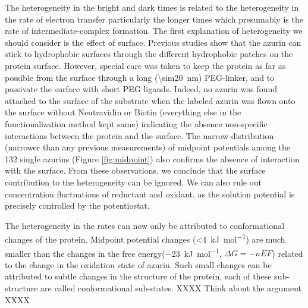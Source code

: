 The heterogeneity in the bright and dark times is related to the heterogeneity in the rate of electron transfer particularly the longer times which presumably is the rate of intermediate-complex formation.
The first explanation of heterogeneity we should consider is the effect of surface.
Previous studies show that the azurin can stick to hydrophobic surfaces through the different hydrophobic patches on the protein surface.\cite{patil2010visualizing,salverda2010fluorescent,akkilic2014chemically-induced}
However, special care was taken to keep the protein as far as possible from the surface through a long (\SI{\sim20}{\nm}) PEG-linker, and to passivate the surface with short PEG ligands.
Indeed, no azurin was found attached to the surface of the substrate when the labeled azurin was flown onto the surface without Neutravidin or Biotin (everything else in the functionalization method kept same) indicating the absence non-specific interactions between the protein and the surface.
The narrow distribution (narrower than any previous measurements) of midpoint potentials among the 132 single azurins (Figure \ref{fig:midpoint}) also confirms the absence of interaction with the surface.
From these observations, we conclude that the surface contribution to the heterogeneity can be ignored.
We can also rule out concentration fluctuations of reductant and oxidant, as the solution potential is precisely controlled by the potentiostat.

The heterogeneity in the rates can now only be attributed to conformational changes of the protein.
Midpoint potential changes (\SI{<4}{\kJ\per\mole}) are much smaller than the changes in the free energy(\SI{-23}{\kJ\per\mole}, $\Delta{G}=-nEF$) related to the change in the oxidation state of azurin. Such small changes can be attributed to subtle changes in the structure of the protein, each of these sub-structure are called conformational sub-states. XXXX Think about the argument XXXX

